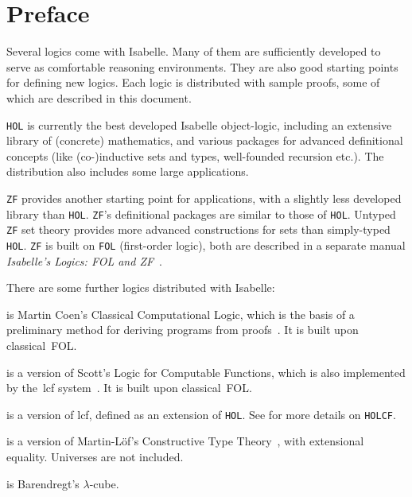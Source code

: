 \chapter*{Preface}
Several logics come with Isabelle.  Many of them are sufficiently developed
to serve as comfortable reasoning environments.  They are also good
starting points for defining new logics.  Each logic is distributed with
sample proofs, some of which are described in this document.

\texttt{HOL} is currently the best developed Isabelle object-logic, including
an extensive library of (concrete) mathematics, and various packages for
advanced definitional concepts (like (co-)inductive sets and types,
well-founded recursion etc.). The distribution also includes some large
applications.

\texttt{ZF} provides another starting point for applications, with a slightly
less developed library than \texttt{HOL}.  \texttt{ZF}'s definitional packages
are similar to those of \texttt{HOL}. Untyped \texttt{ZF} set theory provides
more advanced constructions for sets than simply-typed \texttt{HOL}.
\texttt{ZF} is built on \texttt{FOL} (first-order logic), both are described
in a separate manual \emph{Isabelle's Logics: FOL and ZF}~\cite{isabelle-ZF}.

\medskip There are some further logics distributed with Isabelle:
\begin{ttdescription}
\item[\thydx{CCL}] is Martin Coen's Classical Computational Logic,
  which is the basis of a preliminary method for deriving programs from
  proofs~\cite{coen92}.  It is built upon classical~FOL.
 
\item[\thydx{LCF}] is a version of Scott's Logic for Computable
  Functions, which is also implemented by the~{\sc lcf}
  system~\cite{paulson87}.  It is built upon classical~FOL.
  
\item[\thydx{HOLCF}] is a version of {\sc lcf}, defined as an extension of
  \texttt{HOL}\@. See \cite{MuellerNvOS99} for more details on \texttt{HOLCF}.
 
\item[\thydx{CTT}] is a version of Martin-L\"of's Constructive Type
Theory~\cite{nordstrom90}, with extensional equality.  Universes are not
included.

\item[\thydx{Cube}] is Barendregt's $\lambda$-cube.
 \end{ttdescription}

